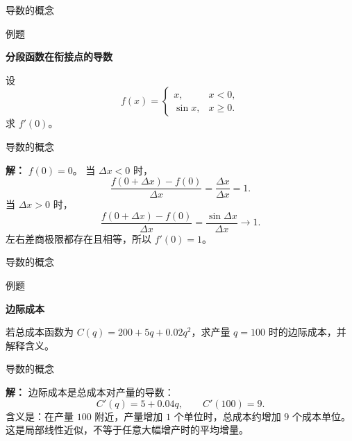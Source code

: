 \documentclass[aspectratio=169,10pt,fontset=fandol]{ctexbeamer}
\newenvironment{warning}{\par\noindent\textbf{注：}\quad}{\par\vspace{0.8em}}
\begin{document}
\begin{frame}[t,fragile]{导数的概念}
\footnotesize
\begin{block}{例题}
{\footnotesize
\textbf{分段函数在衔接点的导数}\par

设
\[
f(x)=
\begin{cases}
x,&x<0,\\
\sin x,&x\geq0.
\end{cases}
\]
求 $f'(0)$。

}
\end{block}
\end{frame}
\begin{frame}[t,fragile]{导数的概念}
\footnotesize
{\footnotesize
\textbf{解：}
$f(0)=0$。 当 $\Delta x<0$ 时，
\[
\frac{f(0+\Delta x)-f(0)}{\Delta x}=\frac{\Delta x}{\Delta x}=1.
\]
当 $\Delta x>0$ 时，
\[
\frac{f(0+\Delta x)-f(0)}{\Delta x}=\frac{\sin\Delta x}{\Delta x}\to1.
\]
左右差商极限都存在且相等，所以 $f'(0)=1$。

}
\end{frame}
\begin{frame}[t,fragile]{导数的概念}
\footnotesize
\begin{block}{例题}
{\footnotesize
\textbf{边际成本}\par

若总成本函数为 $C(q)=200+5q+0.02q^2$，求产量 $q=100$ 时的边际成本，并解释含义。

}
\end{block}
\end{frame}
\begin{frame}[t,fragile]{导数的概念}
\footnotesize
{\footnotesize
\textbf{解：}
边际成本是总成本对产量的导数：
\[
C'(q)=5+0.04q,\qquad C'(100)=9.
\]
含义是：在产量 $100$ 附近，产量增加 $1$ 个单位时，总成本约增加 $9$ 个成本单位。 这是局部线性近似，不等于任意大幅增产时的平均增量。

}
\end{frame}
\end{document}
